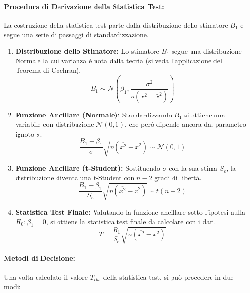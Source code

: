 \paragraph{Procedura di Derivazione della Statistica Test:}
La costruzione della statistica test parte dalla distribuzione dello stimatore
\(B_1\) e segue una serie di passaggi di standardizzazione.

\begin{enumerate}
	\item \textbf{Distribuzione dello Stimatore:} Lo stimatore \(B_1\) segue una
	      distribuzione Normale la cui varianza è nota dalla teoria (si veda
	      l'applicazione del Teorema di Cochran).
	      \[
		      B_1 \sim \mathcal{N}\left(\beta_1,
		      \frac{\sigma^2}{n(\overline{x^2}-\bar{x}^2)}\right)
	      \]

	\item \textbf{Funzione Ancillare (Normale):} Standardizzando \(B_1\) si
	      ottiene una variabile con distribuzione \(\mathcal{N}(0,1)\), che però
	      dipende ancora dal parametro ignoto \(\sigma\).
	      \[
		      \frac{B_1 - \beta_1}{\sigma} \sqrt{n(\overline{x^2}-\bar{x}^2)}
		      \sim \mathcal{N}(0,1)
	      \]

	\item \textbf{Funzione Ancillare (t-Student):} Sostituendo \(\sigma\) con la
	      sua stima \(S_e\), la distribuzione diventa una t-Student con \(n-2\) gradi
	      di libertà.
	      \[
		      \frac{B_1 - \beta_1}{S_e} \sqrt{n(\overline{x^2}-\bar{x}^2)} \sim
		      t(n-2)
	      \]

	\item \textbf{Statistica Test Finale:} Valutando la funzione ancillare sotto
	      l'ipotesi nulla \(H_0: \beta_1 = 0\), si ottiene la statistica test finale
	      da calcolare con i dati.
	      \[
		      T = \frac{B_1}{S_e} \sqrt{n(\overline{x^2}-\bar{x}^2)}
	      \]
\end{enumerate}

\paragraph{Metodi di Decisione:}
Una volta calcolato il valore \(T_{obs}\) della statistica test, si può
procedere in due modi:

